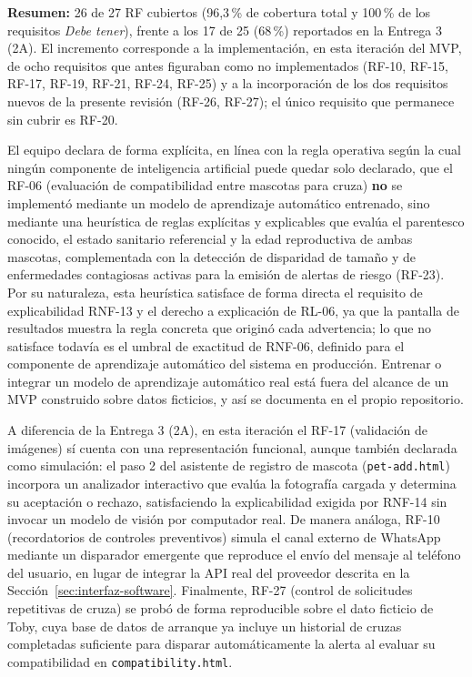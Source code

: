 \documentclass[journal,onecolumn]{IEEEtran}
\begin{document}
	\textbf{Resumen:} 26 de 27 RF cubiertos (96,3\,\% de cobertura total y
	100\,\% de los requisitos \emph{Debe tener}), frente a los 17 de 25
	(68\,\%) reportados en la Entrega 3 (2A). El incremento corresponde a la
	implementación, en esta iteración del MVP, de ocho requisitos que antes
	figuraban como no implementados (RF-10, RF-15, RF-17, RF-19, RF-21, RF-24,
	RF-25) y a la incorporación de los dos requisitos nuevos de la presente
	revisión (RF-26, RF-27); el único requisito que permanece sin cubrir es
	RF-20.
	
	El equipo declara de forma explícita, en línea con la regla operativa según
	la cual ningún componente de inteligencia artificial puede quedar solo
	declarado, que el RF-06 (evaluación de compatibilidad entre mascotas para
	cruza) \textbf{no} se implementó mediante un modelo de aprendizaje
	automático entrenado, sino mediante una heurística de reglas explícitas y
	explicables que evalúa el parentesco conocido, el estado sanitario
	referencial y la edad reproductiva de ambas mascotas, complementada con la
	detección de disparidad de tamaño y de enfermedades contagiosas activas
	para la emisión de alertas de riesgo (RF-23). Por su naturaleza, esta
	heurística satisface de forma directa el requisito de explicabilidad
	RNF-13 y el derecho a explicación de RL-06, ya que la pantalla de
	resultados muestra la regla concreta que originó cada advertencia; lo que
	no satisface todavía es el umbral de exactitud de RNF-06, definido para el
	componente de aprendizaje automático del sistema en producción. Entrenar o
	integrar un modelo de aprendizaje automático real está fuera del alcance de
	un MVP construido sobre datos ficticios, y así se documenta en el propio
	repositorio.
	
	A diferencia de la Entrega 3 (2A), en esta iteración el RF-17 (validación
	de imágenes) sí cuenta con una representación funcional, aunque también
	declarada como simulación: el paso 2 del asistente de registro de mascota
	(\texttt{pet-add.html}) incorpora un analizador interactivo que evalúa la
	fotografía cargada y determina su aceptación o rechazo, satisfaciendo la
	explicabilidad exigida por RNF-14 sin invocar un modelo de visión por
	computador real. De manera análoga, RF-10 (recordatorios de controles
	preventivos) simula el canal externo de WhatsApp mediante un disparador
	emergente que reproduce el envío del mensaje al teléfono del usuario, en
	lugar de integrar la API real del proveedor descrita en la
	Sección~\ref{sec:interfaz-software}. Finalmente, RF-27 (control de
	solicitudes repetitivas de cruza) se probó de forma reproducible sobre el
	dato ficticio de Toby, cuya base de datos de arranque ya incluye un
	historial de cruzas completadas suficiente para disparar automáticamente
	la alerta al evaluar su compatibilidad en \texttt{compatibility.html}.
	
\end{document}
